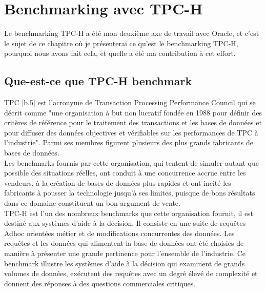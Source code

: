 \chapter{Benchmarking avec TPC-H}
Le benchmarking TPC-H a été mon deuxième axe de travail avec Oracle, et c'est le sujet de ce chapitre où je présenterai ce qu'est le benchmarking TPC-H, pourquoi nous avons fait cela, et quelle a été ma contribution à cet effort.

\section{Que-est-ce que TPC-H benchmark}

TPC [b.5] est l'acronyme de Transaction Processing Performance Council qui se décrit comme "une organisation à but non lucratif fondée en 1988 pour définir des critères de référence pour le traitement des transactions et les bases de données et pour diffuser des données objectives et vérifiables sur les performances de TPC à l'industrie". Parmi ses membres figurent plusieurs des plus grands fabricants de bases de données.\\
Les benchmarks fournis par cette organisation, qui tentent de simuler autant que possible des situations réelles, ont conduit à une concurrence accrue entre les vendeurs, à la création de bases de données plus rapides et ont incité les fabricants à pousser la technologie jusqu'à ses limites, puisque de bons résultats dans ce domaine constituent un bon argument de vente.\\
TPC-H est l'un des nombreux benchmarks que cette organisation fournit, il est destiné aux systèmes d'aide à la décision. Il consiste en une suite de requêtes Adhoc orientées métier et de modifications concurrentes des données. Les requêtes et les données qui alimentent la base de données ont été choisies de manière à présenter une grande pertinence pour l'ensemble de l'industrie. Ce benchmark illustre les systèmes d'aide à la décision qui examinent de grands volumes de données, exécutent des requêtes avec un degré élevé de complexité et donnent des réponses à des questions commerciales critiques.\\

